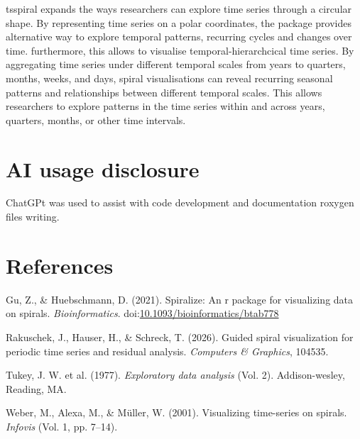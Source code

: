 \documentclass[10pt,a4paper,onecolumn]{article}
\newlength{\cslhangindent}
\newenvironment{CSLReferences}[2] %
 {\begin{list}{}{%
  \setlength{\itemindent}{0pt}
  \setlength{\leftmargin}{0pt}
  \setlength{\parsep}{0pt}
  \ifodd #1
   \setlength{\leftmargin}{\cslhangindent}
   \setlength{\itemindent}{-1\cslhangindent}
  \fi
  \setlength{\itemsep}{#2\baselineskip}}}
 {\end{list}}
\begin{document}
tsspiral expands the ways researchers can explore time series through a
circular shape. By representing time series on a polar coordinates, the
package provides alternative way to explore temporal patterns, recurring
cycles and changes over time. furthermore, this allows to visualise
temporal-hierarchcical time series. By aggregating time series under
different temporal scales from years to quarters, months, weeks, and
days, spiral visualisations can reveal recurring seasonal patterns and
relationships between different temporal scales. This allows researchers
to explore patterns in the time series within and across years,
quarters, months, or other time intervals.

\section{AI usage disclosure}\label{ai-usage-disclosure}

ChatGPt was used to assist with code development and documentation
roxygen files writing.

\section*{References}\label{references}

\label{refs}
\begin{CSLReferences}{1}{0}
Gu, Z., \& Huebschmann, D. (2021). Spiralize: An r package for
visualizing data on spirals. \emph{Bioinformatics}.
doi:\href{https://doi.org/10.1093/bioinformatics/btab778}{10.1093/bioinformatics/btab778}

Rakuschek, J., Hauser, H., \& Schreck, T. (2026). Guided spiral
visualization for periodic time series and residual analysis.
\emph{Computers \& Graphics}, 104535.

Tukey, J. W. et al. (1977). \emph{Exploratory data analysis} (Vol. 2).
Addison-wesley, Reading, MA.

Weber, M., Alexa, M., \& Müller, W. (2001). Visualizing time-series on
spirals. \emph{Infovis} (Vol. 1, pp. 7--14).

\end{CSLReferences}
\end{document}
